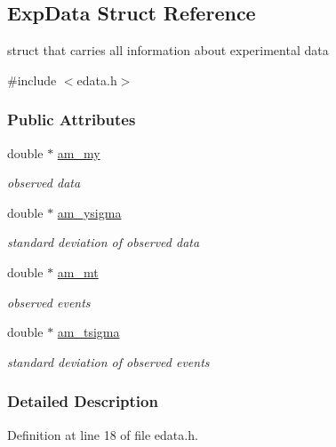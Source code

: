 \hypertarget{struct_exp_data}{}\subsection{Exp\+Data Struct Reference}
\label{struct_exp_data}


struct that carries all information about experimental data  




{\ttfamily \#include $<$edata.\+h$>$}

\subsubsection*{Public Attributes}
\begin{DoxyCompactItemize}
\item 
\hypertarget{struct_exp_data_a1853cfbbd72291b3c37df42b7f07d513}{}double $\ast$ \hyperlink{struct_exp_data_a1853cfbbd72291b3c37df42b7f07d513}{am\+\_\+my}\label{struct_exp_data_a1853cfbbd72291b3c37df42b7f07d513}

\begin{DoxyCompactList}\small\item\em observed data \end{DoxyCompactList}\item 
\hypertarget{struct_exp_data_af29a27d415ab3b3f165e86473412baad}{}double $\ast$ \hyperlink{struct_exp_data_af29a27d415ab3b3f165e86473412baad}{am\+\_\+ysigma}\label{struct_exp_data_af29a27d415ab3b3f165e86473412baad}

\begin{DoxyCompactList}\small\item\em standard deviation of observed data \end{DoxyCompactList}\item 
\hypertarget{struct_exp_data_a44a8bb7cd806b8892c6ebff4d0bc75d4}{}double $\ast$ \hyperlink{struct_exp_data_a44a8bb7cd806b8892c6ebff4d0bc75d4}{am\+\_\+mt}\label{struct_exp_data_a44a8bb7cd806b8892c6ebff4d0bc75d4}

\begin{DoxyCompactList}\small\item\em observed events \end{DoxyCompactList}\item 
\hypertarget{struct_exp_data_a4d3759d9bc2651d74857d8801f8600cf}{}double $\ast$ \hyperlink{struct_exp_data_a4d3759d9bc2651d74857d8801f8600cf}{am\+\_\+tsigma}\label{struct_exp_data_a4d3759d9bc2651d74857d8801f8600cf}

\begin{DoxyCompactList}\small\item\em standard deviation of observed events \end{DoxyCompactList}\end{DoxyCompactItemize}


\subsubsection{Detailed Description}


Definition at line 18 of file edata.\+h.


